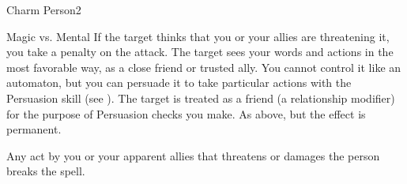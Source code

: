 \begin{spellsection}{Charm Person}{2}
    \begin{spellheader}
    \end{spellheader}
    \begin{spellcontent}
        \begin{spelltargetinginfo}
        \end{spelltargetinginfo}
        \begin{spelleffects}
            \begin{spellattack}{Magic vs. Mental}
                \spellspecial If the target thinks that you or your allies are threatening it, you take a  penalty on the attack.
                \spellsuccess The target sees your words and actions in the most favorable way, as a close friend or trusted ally. You cannot control it like an automaton, but you can persuade it to take particular actions with the Persuasion skill (see ). The target is treated as a friend (a  relationship modifier) for the purpose of Persuasion checks you make.
                \spellcritical As above, but the effect is permanent.
            \end{spellattack}
            \spelldur \durlong
        \end{spelleffects}
    \end{spellcontent}
    \begin{spellfooter}
        \spellnotes Any act by you or your apparent allies that threatens or damages the  person breaks the spell.

        \subtlespellnotes

        \norepeatspellnotes
        \miscastrandom
    \end{spellfooter}
\end{spellsection}

